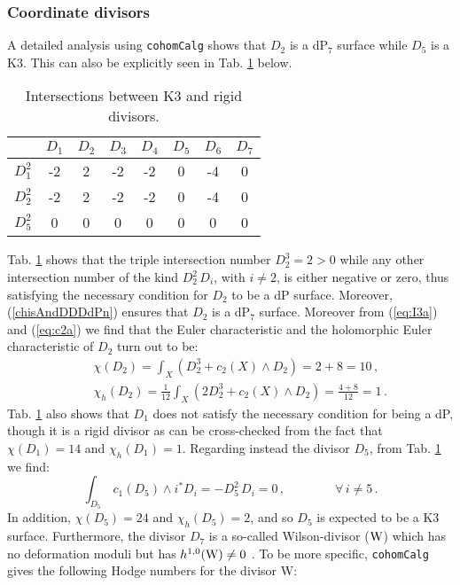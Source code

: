 \documentclass[11pt,a4paper]{article}
\newcommand{\bea}{\begin{eqnarray}}
\newcommand{\eea}{\end{eqnarray}}
\newcommand{\be}{\begin{equation}}
\newcommand{\ee}{\end{equation}}
\def\nn{\nonumber}
\begin{document}
\subsubsection{Coordinate divisors}

A detailed analysis using \texttt{cohomCalg} \cite{Blumenhagen:2010pv, Blumenhagen:2011xn} shows that $D_2$ is a dP$_7$ surface while $D_5$ is a K3. This can also be explicitly seen in Tab. \ref{Tab5} below. 
\begin{table}[H]
  \centering
 \begin{tabular}{|c|ccccccc|}
\hline
     & $D_1$  & $D_2$  & $D_3$  & $D_4$  & $D_5$ & $D_6$  & $D_7$       \\
    \hline
$D_1^2$ & -2  & 2 & -2 & -2 & 0 & -4  & 0   \\
$D_2^2$ & -2  & 2 & -2 & -2 & 0 & -4  & 0   \\
$D_5^2$ & 0  & 0 & 0 & 0 & 0 & 0  & 0   \\
    \hline
  \end{tabular}
  \caption{Intersections between K3 and rigid divisors.}
  \label{Tab5}
 \end{table}
 \noindent
Tab. \ref{Tab5} shows that the triple intersection number $D_2^3 = 2 >0$ while any other intersection number of the kind $D_2^2\, D_i$, with $i \neq 2$, is either negative or zero, thus satisfying the necessary condition for $D_2$ to be a dP surface. Moreover, (\ref{chisAndDDDdPn}) ensures that $D_2$ is a dP$_7$ surface. Moreover from (\ref{eq:I3a}) and (\ref{eq:c2a}) we find that the Euler characteristic and the holomorphic Euler characteristic of $D_2$ turn out to be:
\bea
& & \chi(D_2) = \int_X \left(D_2^3 + c_2(X) \wedge D_2 \right) = 2 + 8 =10\,, \\
& &  \chi_h(D_2) = \frac{1}{12} \int_X \left(2 D_2^3 + c_2(X) \wedge D_2 \right) = \frac{4+8}{12}= 1\,. \nn
\eea
Tab. \ref{Tab5} also shows that $D_1$ does not satisfy the necessary condition for being a dP, though it is a rigid divisor as can be cross-checked from the fact that $\chi(D_1) =14$ and $\chi_h(D_1) = 1$. Regarding instead the divisor $D_5$, from Tab. \ref{Tab5} we find:
\be
\int_{D_5}\, c_1(D_5) \wedge i^{*}D_i = -D_5^2\, D_i = 0\,, \qquad \qquad \forall \, i \neq 5\,.
\ee
In addition, $\chi(D_5) = 24$ and $\chi_h(D_5) = 2$, and so $D_5$ is expected to be a K3 surface. Furthermore, the divisor $D_7$ is a so-called Wilson-divisor ($\rm W$) which has no deformation moduli but has $h^{1,0}({\rm W})\neq 0$ \cite{Gao:2013pra, Blumenhagen:2012kz}. To be more specific, \texttt{cohomCalg} gives the following Hodge numbers for the divisor W:
\end{document}
